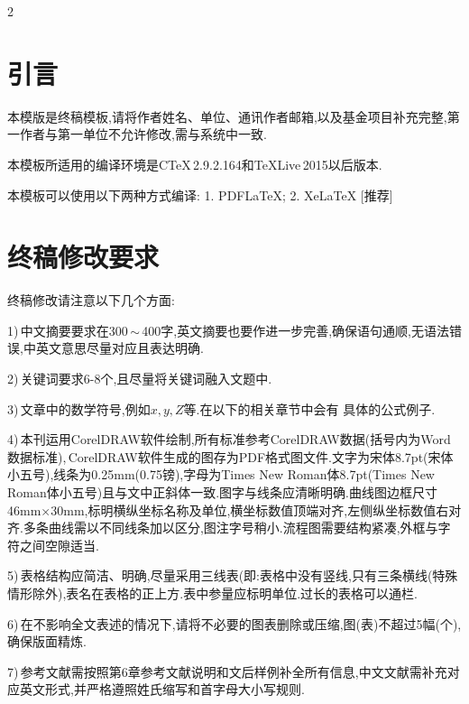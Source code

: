 \documentclass{ctacn}%
\begin{document}

\maketitle




\begin{multicols}{2}
\section{引\quad  言}
本模版是终稿模板,请将作者姓名、单位、通讯作者邮箱,以及基金项目补充完整,第一作者与第一单位不允许修改,需与系统中一致.

本模板所适用的编译环境是CTeX\,2.9.2.164和\linebreak TeXLive\,2015以后版本.

本模板可以使用以下两种方式编译: 1. PDFLaTeX; 2. XeLaTeX [推荐]

\section{终稿修改要求}
终稿修改请注意以下几个方面:

1)\,中文摘要要求在300\,$\sim$\,400字,英文摘要也要作进一步完善,确保语句通顺,无语法错误,中英文意思尽量对应且表达明确.

2)\,关键词要求6-8个,且尽量将关键词融入文题中.

3)\,文章中的数学符号,例如$x, y, Z$等.在以下的相关章节中会有
具体的公式例子.

4)\,本刊运用CorelDRAW软件绘制,所有标准参考CorelDRAW数据(括号内为Word数据标准),\,CorelDRAW软件生成的图存为PDF格式图文件.文字为宋体8.7pt(宋体小五号),线条为0.25mm(0.75镑),字母为Times New Roman体8.7pt(Times New Roman体小五号)且与文中正斜体一致.图字与线条应清晰明确.曲线图边框尺寸46mm$\times$30mm,标明横纵坐标名称及单位,横坐标数值顶端对齐,左侧纵坐标数值右对齐.多条曲线需以不同线条加以区分,图注字号稍小.流程图需要结构紧凑,外框与字符之间空隙适当.

5)\,表格结构应简洁、明确,尽量采用三线表(即:表格中没有竖线,只有三条横线(特殊情形除外),表名在表格的正上方.\;表中参量应标明单位.\;过长的表格可以通栏.

6)\,在不影响全文表述的情况下,请将不必要的图表删除或压缩,图(表)不超过5幅(个),确保版面精炼.

7)\,参考文献需按照第6章参考文献说明和文后样例补全所有信息,中文文献需补充对应英文形式,并严格遵照姓氏缩写和首字母大小写规则.


\end{multicols}
\end{document}
